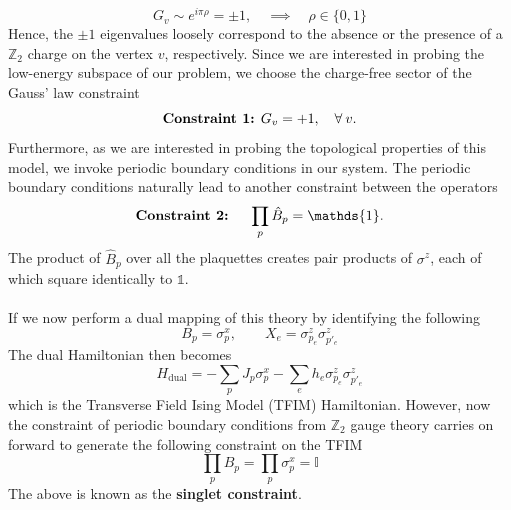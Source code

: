 \documentclass[../thesis_main.tex]{subfiles}
\begin{document}
\begin{equation}
    G_v \sim e^{i \pi \rho} = \pm 1, \quad \implies \quad \rho \in \{0, 1\} 
\end{equation}
Hence, the $\pm 1$ eigenvalues loosely correspond to the absence or the presence of a $\mathbb{Z}_2$ charge on the vertex $v$, respectively. Since we are interested in probing the low-energy subspace of our problem, we choose the charge-free sector of the Gauss' law constraint
\begin{equation}
    \text{\textbf{Constraint 1:} }G_v = + 1, \quad \forall \: v.
    \label{gausslaw}
\end{equation}
Furthermore, as we are interested in probing the topological properties of this model, we invoke periodic boundary conditions in our system. The periodic boundary conditions naturally lead to another constraint between the operators
\begin{equation}
    \text{\textbf{Constraint 2:} } \quad \prod_p \hat{B}_p = \mathds{1}.
\end{equation}
The product of $\hat{B}_p$ over all the plaquettes creates pair products of $\sigma^z$, each of which square identically to $\mathds{1}$.~\\~\\
If we now perform a dual mapping of this theory by identifying the following
\[
    B_p = \sigma^x_p, \qquad X_e = \sigma^z_{p_e} \sigma^z_{p'_e}
\]
The dual Hamiltonian then becomes 
\begin{equation}
    H_\text{dual} = - \sum_p J_p \sigma^x_p - \sum_e h_e \sigma^z_{p_e} \sigma^z_{p'_e}
\end{equation}
which is the Transverse Field Ising Model (TFIM) Hamiltonian. However, now the constraint of periodic boundary conditions from $\mathbb{Z}_2$ gauge theory carries on forward to generate the following constraint on the TFIM
\[
    \prod_p B_p = \boxed{\prod_p \sigma^x_p = \mathbb{I}}
\]
The above is known as the \textbf{singlet constraint}.
\end{document}
